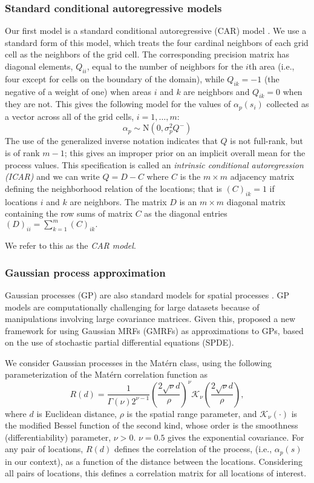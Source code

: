 \documentclass[12pt]{article}\usepackage[]{graphicx}\usepackage[]{color}
\newcommand{\matern}{Mat\'{e}rn }
\begin{document}
\subsubsection{Standard conditional autoregressive models}

Our first model is a standard conditional autoregressive (CAR) model
\citep{Bane:etal:2003}. We use a standard form of this model, which
treats the four cardinal neighbors of each grid cell as the neighbors
of the grid cell. The corresponding precision matrix has diagonal
elements, $Q_{ii}$, equal to the number of neighbors for the $i$th
area (i.e., four except for cells on the boundary of the domain),
while $Q_{ik}=-1$ (the negative of a weight of one) when areas $i$
and $k$ are neighbors and $Q_{ik}=0$ when they are not. This gives
the following model for the values of $\alpha_{p}(s_{i})$ collected
as a vector across all of the grid cells, $i=1,\ldots,m$: 
\[
\alpha_{p}\sim\mbox{N}(0,\sigma_{p}^{2}Q^{-})
\]
The use of the generalized inverse notation indicates that $Q$ is
not full-rank, but is of rank $m-1$; this gives an improper prior
on an implicit overall mean for the process values. This specification
is called an \textit{intrinsic conditional autoregression (ICAR)}
and we can write $Q=D-C$ where $C$ is the $m\times m$ adjacency
matrix defining the neighborhood relation of the locations; that is
$(C)_{ik}=1$ if locations $i$ and $k$ are neighbors. The matrix
$D$ is an $m\times m$ diagonal matrix containing the row sums of
matrix $C$ as the diagonal entries $(D)_{ii}={\displaystyle \sum_{k=1}^{m}(C)_{ik}}.$

We refer to this as the \emph{CAR model}.


\subsubsection{Gaussian process approximation}

Gaussian processes (GP) are also standard models for spatial processes \citep{Bane:etal:2003}.
GP models are computationally challenging for large datasets because
of manipulations involving large covariance matrices. Given this,
\cite{Lind:etal:2011} proposed a new framework for using Gaussian
MRFs (GMRFs) as approximations to GPs, based on the use of stochastic
partial differential equations (SPDE).

We consider Gaussian processes in the \matern class, using the following
parameterization of the \matern correlation function as 
\begin{equation}
R(d)=\frac{1}{\Gamma(\nu)2^{\nu-1}}\left(\frac{2\sqrt{\nu}d}{\rho}\right)^{\nu}\mathcal{K}_{\nu}\left(\frac{2\sqrt{\nu}d}{\rho}\right),\label{eq:Matern}
\end{equation}
where $d$ is Euclidean distance, $\rho$ is the spatial range parameter,
and $\mathcal{K}_{\nu}(\cdot)$ is the modified Bessel function of
the second kind, whose order is the smoothness (differentiability)
parameter, $\nu>0$. $\nu=0.5$ gives the exponential covariance.
For any pair of locations, $R(d)$ defines the correlation of the
process, (i.e., $\alpha_{p}(s)$ in our context), as a function of
the distance between the locations. Considering all pairs of locations,
this defines a correlation matrix for all locations of interest. 
\end{document}
